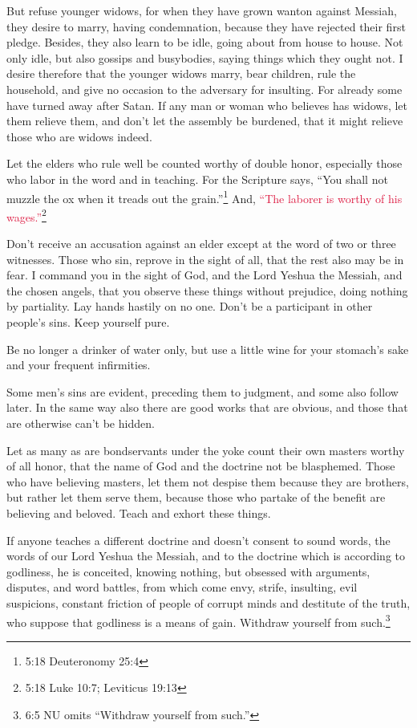 \myverse{}But refuse younger widows, for when they have grown wanton against
Messiah, they desire to marry,
\myverse{}having condemnation, because they have rejected their first pledge.
\myverse{}Besides, they also learn to be idle, going about from house to house. Not
only idle, but also gossips and busybodies, saying things which they ought not.
\myverse{}I desire therefore that the younger widows marry, bear children, rule the
household, and give no occasion to the adversary for insulting.
\myverse{}For already some have turned away after Satan.
\myverse{}If any man or woman who believes has widows, let them relieve them, and don’t
let the assembly be burdened, that it might relieve those who are widows indeed.

\myverse{}Let the elders who rule well be counted worthy of double honor,
especially those who labor in the word and in teaching.
\myverse{}For the Scripture says, “You shall not muzzle the ox when it treads out the
grain.”\footnote{5:18 Deuteronomy 25:4} And,
\textcolor{crimson}{“The laborer is worthy of his wages.”}\footnote{5:18 Luke 10:7;
	Leviticus 19:13}

\myverse{}Don’t receive an accusation against an elder except at the word
of two or three witnesses.
\myverse{}Those who sin, reprove in the sight of all, that the rest also may be in fear.
\myverse{}I command you in the sight of God, and the Lord Yeshua the Messiah, and the
chosen angels, that you observe these things without prejudice, doing nothing by partiality.
\myverse{}Lay hands hastily on no one. Don’t be a participant in other people’s sins.
Keep yourself pure.

\myverse{}Be no longer a drinker of water only, but use a little wine for
your stomach’s sake and your frequent infirmities.

\myverse{}Some men’s sins are evident, preceding them to judgment, and
some also follow later.
\myverse{}In the same way also there are good works that are obvious, and those that
are otherwise can’t be hidden.


\mychapter{} \myverse*{}Let as many as are bondservants under the yoke count their own
masters worthy of all honor, that the name of God and the doctrine not be blasphemed.
\myverse{}Those who have believing masters, let them not despise them because they are
brothers, but rather let them serve them, because those who partake of the benefit are believing and beloved.
Teach and exhort these things.

\myverse{}If anyone teaches a different doctrine and doesn’t consent to sound
words, the words of our Lord Yeshua the Messiah, and to the doctrine which is according to godliness,
\myverse{}he is conceited, knowing nothing, but obsessed with arguments, disputes, and
word battles, from which come envy, strife, insulting, evil suspicions,
\myverse{}constant friction of people of corrupt minds and destitute of the truth, who
suppose that godliness is a means of gain. Withdraw yourself from such.\footnote{6:5 NU omits “Withdraw yourself from such.”}

